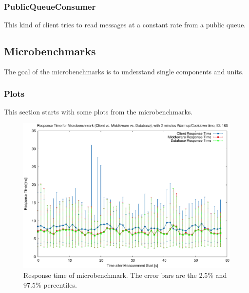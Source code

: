 \documentclass[milestone1.tex]{subfiles}
\begin{document}
\subsubsection{PublicQueueConsumer}
This kind of client tries to read messages at a constant rate from a public queue.


\subsection{Microbenchmarks}

The goal of the microbenchmarks is to understand single components and units.

\subsubsection{Plots}

This section starts with some plots from the microbenchmarks.

\begin{figure}[H]
	\begin{center}
    \includegraphics[scale=0.55]{../exported_plots/microbenchmarks/response_time.eps}
  \end{center}
  \caption{Response time of microbenchmark. The error bars are the 2.5\% and 97.5\% percentiles.}
  \label{fig:mictobenchmarksrt}
\end{figure}
\end{document}
